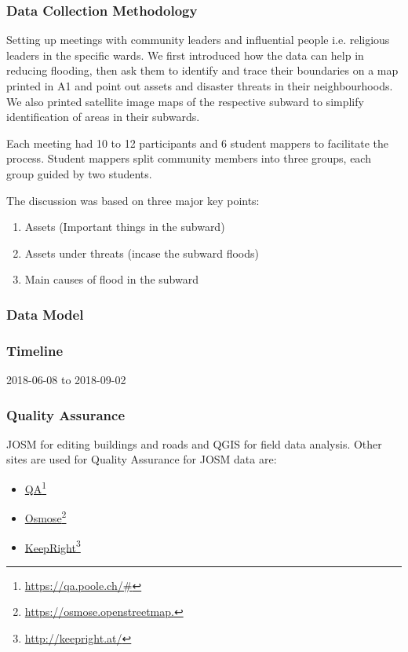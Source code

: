 \documentclass[a4paper,12pt,twoside]{article}
\begin{document}
\subsubsection{Data Collection Methodology}

Setting up meetings with community leaders and influential people i.e. religious leaders in the specific wards. We first introduced how the data can help in reducing flooding, then ask them to identify and trace their boundaries on a map printed in A1 and point out assets and disaster threats in their neighbourhoods. We also printed satellite image maps of the respective subward to simplify identification of areas in their subwards.

Each meeting had 10 to 12 participants and 6 student mappers to facilitate the process. Student mappers split community members into three groups, each group guided by two students.

The discussion was based on three major key points:
\begin{enumerate}
    \item Assets (Important things in the subward)
    \item Assets under threats (incase the subward floods)
    \item Main causes of flood in the subward
\end{enumerate}

\subsubsection{Data Model}

\subsubsection{Timeline}
2018-06-08 to 2018-09-02

\subsubsection{Quality Assurance}
JOSM for editing buildings and roads and QGIS for field data analysis. Other sites are used for Quality Assurance for JOSM data are:
\begin{itemize}
    \item \href{https://qa.poole.ch/#}{QA}\footnote{\url{https://qa.poole.ch/#}}
    \item \href{https://osmose.openstreetmap.}{Osmose}\footnote{\url{https://osmose.openstreetmap.}}
    \item \href{http://keepright.at/}{KeepRight}\footnote{\url{http://keepright.at/}}
\end{itemize}
\end{document}
